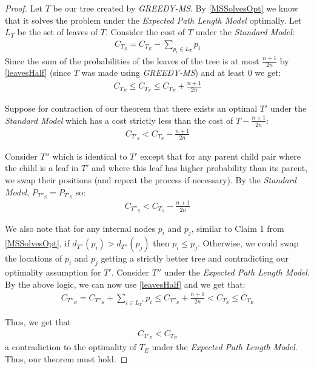 \documentclass[letterpaper,12pt,titlepage,oneside,final]{book}
\theoremstyle{plain}
\begin{document}
\begin{proof}
Let $T$ be our tree created by \textit{GREEDY-MS}. By \ref{MSSolvesOpt} we know that it solves the problem under the \textit{Expected Path Length Model} optimally. Let $L_T$ be the set of leaves of $T$. Consider the cost of $T$ under the \textit{Standard Model}:
\begin{align*}
C_{T_S} = C_{T_E} - \sum_{p_i \in L_T} p_i
\end{align*}
Since the sum of the probabilities of the leaves of the tree is at most $\frac{n+1}{2n}$ by \ref{leavesHalf} (since $T$ was made using \textit{GREEDY-MS}) and at least $0$ we get:
\begin{align*}
C_{T_E} \leq C_{T_S} \leq C_{T_E} + \frac{n+1}{2n}
\end{align*}

Suppose for contraction of our theorem that there exists an optimal $T'$ under the \textit{Standard Model} which has a cost strictly less than the cost of $T-\frac{n+1}{2n}$:
\begin{align*}
C_{T'_S} < C_{T_S} - \frac{n+1}{2n}
\end{align*}

Consider $T''$ which is identical to $T'$ except that for any parent child pair where the child is a leaf in $T'$ and where this leaf has higher probability than its parent, we swap their positions (and repeat the process if necessary). By the \textit{Standard Model}, $P_{T''_S} = P_{T'_S}$ so:
\begin{align*}
C_{T''_S} < C_{T_S} - \frac{n+1}{2n}
\end{align*} 

We also note that for any internal nodes $p_i$ and $p_j$, similar to Claim 1 from \ref{MSSolvesOpt}, if $d_{T''}(p_i) > d_{T''}(p_j)$ then $p_i \leq p_j$. Otherwise, we could swap the locations of $p_i$ and $p_j$ getting a strictly better tree and contradicting our optimality assumption for $T'$. Consider $T''$ under the \textit{Expected Path Length Model}. By the above logic, we can now use \ref{leavesHalf} and we get that:
\begin{align*}
C_{T''_E} = C_{T''_S} + \sum_{i \in L_T'}p_i \leq C_{T''_S} + \frac{n+1}{2n} < C_{T_S} \leq C_{T_E}
\end{align*}

\noindent Thus, we get that
\begin{align*}
C_{T'_E} < C_{T_E}
\end{align*} 
a contradiction to the optimality of $T_E$ under the \textit{Expected Path Length Model}. Thus, our theorem must hold.

\end{proof}
\end{document}
